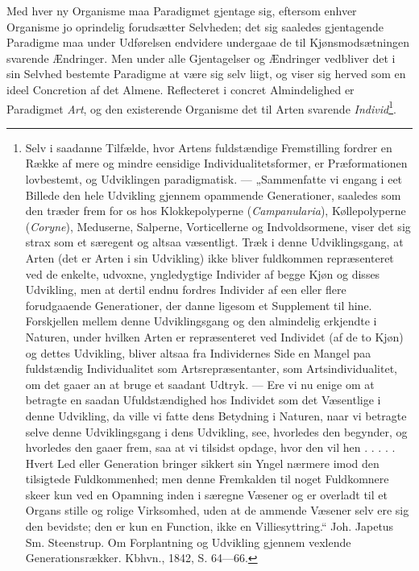 \documentclass[12pt,a4paper]{book}
\begin{document}
Med hver ny Organisme maa Paradigmet gjentage sig, eftersom enhver
Organisme jo oprindelig forudsætter Selvheden; det sig saaledes
gjentagende Paradigme maa under Udførelsen endvidere undergaae de til
Kjønsmodsætningen svarende Ændringer. Men under alle Gjentagelser og
Ændringer vedbliver det i sin Selvhed bestemte Paradigme at være sig selv
liigt, og viser sig herved som en ideel Concretion af det Almene.
Reflecteret i concret Almindelighed er Paradigmet \emph{Art}, og den
existerende Organisme det til Arten svarende
\emph{Individ}\footnote{Selv i saadanne Tilfælde, hvor Artens
fuldstændige Fremstilling fordrer en Række af mere og mindre eensidige
Individualitetsformer, er Præformationen lovbestemt, og Udviklingen
paradigmatisk. --- „Sammenfatte vi engang i eet Billede den hele
Udvikling gjennem opammende Generationer, saaledes som den træder frem
for os hos Klokkepolyperne (\textit{Campanularia}), Køllepolyperne
(\textit{Coryne}), Meduserne, Salperne, Vorticellerne og
Indvoldsormene, viser det sig strax som et særegent og altsaa
væsentligt. Træk i denne Udviklingsgang, at Arten (det er Arten i sin
Udvikling) ikke bliver fuldkommen repræsenteret ved de enkelte, udvoxne,
yngledygtige Individer af begge Kjøn og disses Udvikling, men at dertil
endnu fordres Individer af een eller flere forudgaaende Generationer, der
danne ligesom et Supplement til hine. Forskjellen mellem denne
Udviklingsgang og den almindelig erkjendte i Naturen, under hvilken Arten
er repræsenteret ved Individet (af de to Kjøn) og dettes Udvikling,
bliver altsaa fra Individernes Side en Mangel paa fuldstændig
Individualitet som Artsrepræsentanter, som Artsindividualitet, om det
gaaer an at bruge et saadant Udtryk. --- Ere vi nu enige om at betragte
en saadan Ufuldstændighed hos Individet som det Væsentlige i denne
Udvikling, da ville vi fatte dens Betydning i Naturen, naar vi betragte
selve denne Udviklingsgang i dens Udvikling, see, hvorledes den begynder,
og hvorledes den gaaer frem, saa at vi tilsidst opdage, hvor den vil hen
. . . . . Hvert Led eller Generation bringer sikkert sin Yngel nærmere
imod den tilsigtede Fuldkommenhed; men denne Fremkalden til noget
Fuldkomnere skeer kun ved en Opamning inden i særegne Væsener og er
overladt til et Organs stille og rolige Virksomhed, uden at de ammende
Væsener selv ere sig den bevidste; den er kun en Function, ikke en
Villiesyttring.“ Joh. Japetus Sm. Steenstrup. Om Forplantning og
Udvikling gjennem vexlende Generationsrækker. Kbhvn., 1842, S. 64---66.}.
\end{document}
